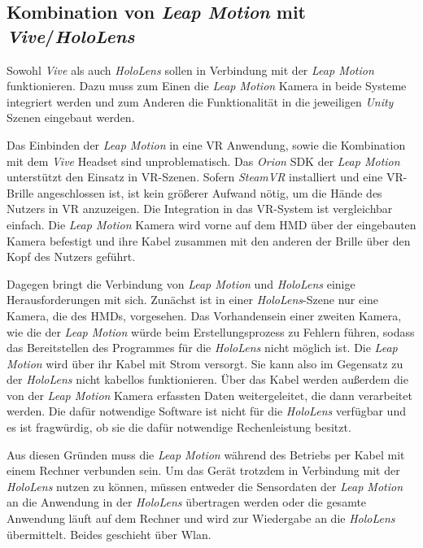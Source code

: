 \subsection{Kombination von \textit{Leap Motion} mit \textit{Vive}/\textit{HoloLens}}
\label{kombination}

Sowohl \textit{Vive} als auch \textit{HoloLens} sollen in Verbindung mit der \textit{Leap Motion} funktionieren. Dazu muss zum Einen die \textit{Leap Motion} Kamera in beide Systeme integriert werden und zum Anderen die Funktionalität in die jeweiligen \textit{Unity} Szenen eingebaut werden. 

Das Einbinden der \textit{Leap Motion} in eine VR Anwendung, sowie die Kombination mit dem \textit{Vive} Headset sind unproblematisch. Das \textit{Orion} SDK der \textit{Leap Motion} unterstützt den Einsatz in VR-Szenen. Sofern \textit{SteamVR} installiert und eine VR-Brille angeschlossen ist, ist kein größerer Aufwand nötig, um die Hände des Nutzers in VR anzuzeigen. 
Die Integration in das VR-System ist vergleichbar einfach. Die \textit{Leap Motion} Kamera wird vorne auf dem HMD über der eingebauten Kamera befestigt und ihre Kabel zusammen mit den anderen der Brille über den Kopf des Nutzers geführt. 

Dagegen bringt die Verbindung von \textit{Leap Motion} und \textit{HoloLens} einige Herausforderungen mit sich. Zunächst ist in einer \textit{HoloLens}-Szene nur eine Kamera, die des HMDs, vorgesehen. Das Vorhandensein einer zweiten Kamera, wie die der \textit{Leap Motion} würde beim Erstellungsprozess zu Fehlern führen, sodass das Bereitstellen des Programmes für die \textit{HoloLens} nicht möglich ist.
Die \textit{Leap Motion} wird über ihr Kabel mit Strom versorgt. Sie kann also im Gegensatz zu der \textit{HoloLens} nicht kabellos funktionieren. 
Über das Kabel werden außerdem die von der \textit{Leap Motion} Kamera erfassten Daten weitergeleitet, die dann verarbeitet werden. Die dafür notwendige Software ist nicht für die \textit{HoloLens} verfügbar und es ist fragwürdig, ob sie die dafür notwendige Rechenleistung besitzt. 

Aus diesen Gründen muss die \textit{Leap Motion} während des Betriebs per Kabel mit einem Rechner verbunden sein. Um das Gerät trotzdem in Verbindung mit der \textit{HoloLens} nutzen zu können, müssen entweder die Sensordaten der \textit{Leap Motion} an die Anwendung in der \textit{HoloLens} übertragen werden oder die gesamte Anwendung läuft auf dem Rechner und wird zur Wiedergabe an die \textit{HoloLens} übermittelt. Beides geschieht über Wlan.

